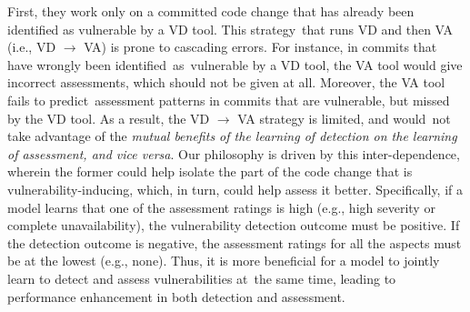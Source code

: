 First, they work only on a committed code change that has already been identified as vulnerable by a VD tool.
This strategy~that runs VD and then VA (i.e., VD $\rightarrow$ VA)
is prone to cascading errors.
For instance, in commits that have wrongly been
identified~as~vulnerable by a VD tool, the VA tool would give
incorrect assessments, which should not be given at all. Moreover, the VA
tool fails to predict~assessment patterns in commits that are
vulnerable, but missed by the VD tool. As a result, the VD
$\rightarrow$ VA strategy is limited, and would~not take advantage of
the {\em mutual benefits of the learning of detection on the learning
  of assessment, and vice versa}.  Our philosophy is driven by this
inter-dependence, wherein the former could help isolate the part of
the code change that is vulnerability-inducing, which, in turn, could
help assess it better. Specifically, if a model learns that one of the
assessment ratings is high (e.g., high severity or complete
unavailability), the vulnerability detection outcome must be
positive. If the detection outcome is negative, the assessment ratings
for all the aspects must be at the lowest (e.g., none). Thus, it is
more beneficial for a model to jointly learn to detect and assess
vulnerabilities at~the same time, leading to performance enhancement
in both detection and assessment.


